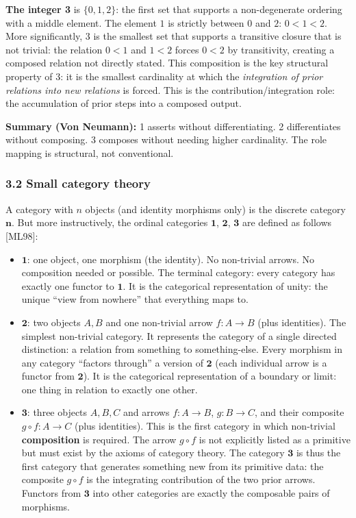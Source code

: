 \documentclass[
  11pt,
  letterpaper,
]{article}
\begin{document}
\textbf{The integer 3} is \(\{0, 1, 2\}\): the first set that supports a
non-degenerate ordering with a middle element. The element \(1\) is
strictly between \(0\) and \(2\): \(0 < 1 < 2\). More significantly, 3
is the smallest set that supports a transitive closure that is not
trivial: the relation \(0 < 1\) and \(1 < 2\) forces \(0 < 2\) by
transitivity, creating a composed relation not directly stated. This
composition is the key structural property of 3: it is the smallest
cardinality at which the \emph{integration of prior relations into new
relations} is forced. This is the contribution/integration role: the
accumulation of prior steps into a composed output.

\textbf{Summary (Von Neumann):} 1 asserts without differentiating. 2
differentiates without composing. 3 composes without needing higher
cardinality. The role mapping is structural, not conventional.

\subsubsection{3.2 Small category theory}\label{small-category-theory}

A category with \(n\) objects (and identity morphisms only) is the
discrete category \(\mathbf{n}\). But more instructively, the ordinal
categories \(\mathbf{1}\), \(\mathbf{2}\), \(\mathbf{3}\) are defined as
follows {[}ML98{]}:

\begin{itemize}
\item
  \(\mathbf{1}\): one object, one morphism (the identity). No
  non-trivial arrows. No composition needed or possible. The terminal
  category: every category has exactly one functor to \(\mathbf{1}\). It
  is the categorical representation of unity: the unique ``view from
  nowhere'' that everything maps to.
\item
  \(\mathbf{2}\): two objects \(A, B\) and one non-trivial arrow
  \(f: A \to B\) (plus identities). The simplest non-trivial category.
  It represents the category of a single directed distinction: a
  relation from something to something-else. Every morphism in any
  category ``factors through'' a version of \(\mathbf{2}\) (each
  individual arrow is a functor from \(\mathbf{2}\)). It is the
  categorical representation of a boundary or limit: one thing in
  relation to exactly one other.
\item
  \(\mathbf{3}\): three objects \(A, B, C\) and arrows \(f: A \to B\),
  \(g: B \to C\), and their composite \(g \circ f: A \to C\) (plus
  identities). This is the first category in which non-trivial
  \textbf{composition} is required. The arrow \(g \circ f\) is not
  explicitly listed as a primitive but must exist by the axioms of
  category theory. The category \(\mathbf{3}\) is thus the first
  category that generates something new from its primitive data: the
  composite \(g \circ f\) is the integrating contribution of the two
  prior arrows. Functors from \(\mathbf{3}\) into other categories are
  exactly the composable pairs of morphisms.
\end{itemize}
\end{document}
